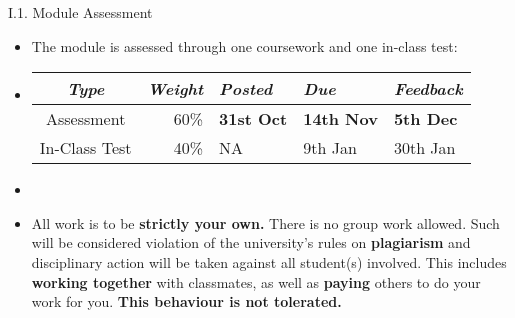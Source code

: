 \documentclass[handout]{beamer}
\newcommand{\strong}[1]{\textbf{\color{teal} #1}}
\newcommand{\stronger}[1]{\textbf{\color{purple} #1}}
\begin{document}
\begin{frame}{I.1. Module Assessment}
\begin{itemize}
\item The module is assessed through one coursework and one in-class test: 
\item[]
\begin{tabular}{|c|r|l|l|l|}
\emph{Type} & \emph{Weight} & \emph{Posted} & \emph{Due} & \emph{Feedback} \\
\hline
Assessment & 60\% & \textbf{31st Oct} & \textbf{14th Nov} & \textbf{5th Dec} \\
\hline
In-Class Test & 40\% & NA & 9th Jan & 30th Jan\\
\hline
\end{tabular}
\item[]
\item All work is to be \stronger{strictly your own.}
There is no group work allowed.
Such will be considered violation of the university's rules on \strong{plagiarism} and disciplinary action will be taken against all student(s) involved.
This includes \strong{working together} with classmates, as well as \strong{paying} others to do your work for you.
\stronger{This behaviour is not tolerated.}
\end{itemize}
\end{frame}
\end{document}
